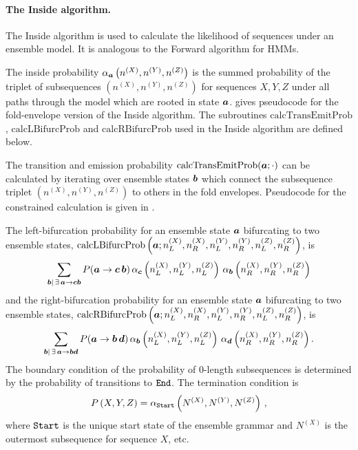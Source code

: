 \documentclass[10pt]{article}
\begin{document}
\paragraph{The Inside algorithm.}
The Inside algorithm is used to calculate the likelihood of sequences under an ensemble model.  It is analogous to the Forward algorithm for HMMs.

The inside probability $\alpha_{\boldsymbol{a}} \left(n^{(X)}, n^{(Y)}, n^{(Z)}\right)$ is the summed probability of the triplet of subsequences 
$\left( n^{(X)}, n^{(Y)}, n^{(Z)} \right)$ for sequences $X, Y, Z$
under all paths through the model which are rooted in state $\boldsymbol{a}$.  
 gives pseudocode for the fold-envelope version of the Inside algorithm.  The subroutines 
$\mathrm{calcTransEmitProb}$, $\mathrm{calcLBifurcProb}$ and $\mathrm{calcRBifurcProb}$
used in the Inside algorithm are defined below.

The transition and emission probability $\mathrm{calcTransEmitProb}(\boldsymbol{a}; \cdot)$ can be calculated 
by iterating over ensemble states $\boldsymbol{b}$ which connect the subsequence triplet $\left(n^{(X)}, n^{(Y)}, n^{(Z)}\right)$ to others in the fold envelopes.
Pseudocode for the constrained calculation is given in .

The left-bifurcation probability for an ensemble state $\boldsymbol{a}$
bifurcating to two ensemble states,
\newline
$\mathrm{calcLBifurcProb}\left( \boldsymbol{a}; n^{(X)}_L,n^{(X)}_R,n^{(Y)}_L,n^{(Y)}_R,n^{(Z)}_L,n^{(Z)}_R \right)$, is
\[ \sum_{\boldsymbol{b}|\,\exists\, \boldsymbol{a}\to\boldsymbol{c}\boldsymbol{b}} P (\boldsymbol{a}\to\boldsymbol{c}\,\boldsymbol{b}) \, \alpha_{\boldsymbol{c}}\left( n^{(X)}_L,n^{(Y)}_L,n^{(Z)}_L\right) \, \alpha_{\boldsymbol{b}}\left( n^{(X)}_R,n^{(Y)}_R,n^{(Z)}_R\right) \]
and the right-bifurcation probability for an ensemble state $\boldsymbol{a}$
bifurcating to two ensemble states,
\newline
$\mathrm{calcRBifurcProb}\left( \boldsymbol{a}; n^{(X)}_L,n^{(X)}_R,n^{(Y)}_L,n^{(Y)}_R,n^{(Z)}_L,n^{(Z)}_R \right)$, is
\[ \sum_{\boldsymbol{b}|\,\exists\, \boldsymbol{a}\to\boldsymbol{b}\boldsymbol{d}} P (\boldsymbol{a}\to\boldsymbol{b}\,\boldsymbol{d}) \, \alpha_{\boldsymbol{b}}\left( n^{(X)}_L,n^{(Y)}_L,n^{(Z)}_L\right) \, \alpha_{\boldsymbol{d}}\left( n^{(X)}_R,n^{(Y)}_R,n^{(Z)}_R\right) . \]
The boundary condition of the probability of 0-length subsequences is determined by the probability of transitions to $\mathtt{End}$.
The termination condition is 
\[ P \left( X, Y, Z \right) = \alpha_{\mathtt{Start}}\left(N^{(X)}, N^{(Y)}, N^{(Z)}\right) \, , \]
where $\mathtt{Start}$ is the unique start state of the ensemble grammar and $N^{(X)}$ is the outermost subsequence for sequence $X$, etc.
\end{document}
